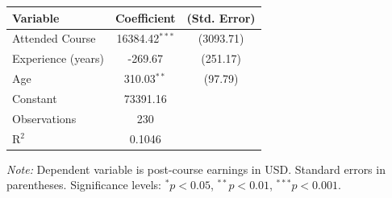 \begin{tabular}{lcc}
\toprule
Variable & Coefficient & (Std. Error) \\
\midrule
Attended Course & 16384.42$^{***}$ & (3093.71) \\
Experience (years) & -269.67 & (251.17) \\
Age & 310.03$^{**}$ & (97.79) \\
Constant & 73391.16 & \\
\midrule
Observations & 230 & \\
R$^2$ & 0.1046 & \\
\bottomrule
\end{tabular}

\vspace{0.3em}

\textit{Note:} Dependent variable is post-course earnings in USD. Standard errors in parentheses.
Significance levels: $^{*}p<0.05$, $^{**}p<0.01$, $^{***}p<0.001$.